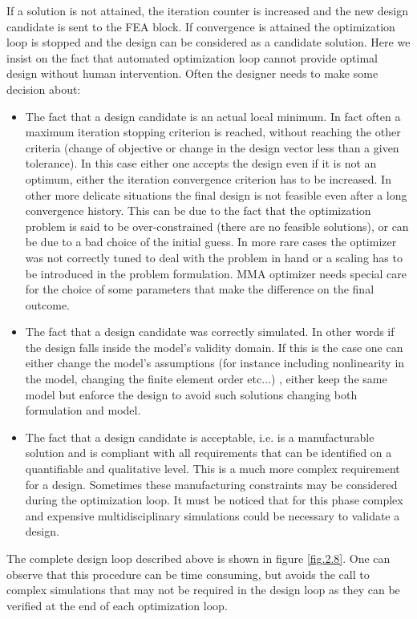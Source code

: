 If a solution is not attained, the iteration counter is increased and the new design candidate is sent to the FEA block.
If convergence is attained the optimization loop is stopped and the design can be considered as a candidate solution. Here we insist on the fact that automated optimization loop cannot provide optimal design without human intervention. 
Often the designer needs to make some decision about:
\begin{itemize}
\item The fact that a design candidate is an actual local minimum. In fact often a maximum iteration stopping criterion is reached, without reaching the other criteria (change of objective or change in the design vector less than a given tolerance). In this case either one accepts the design even if it is not an optimum, either the iteration convergence criterion has to be increased. In other more delicate situations the final design is not feasible even after a long convergence history. This can be due to the fact that the optimization problem is said to be over-constrained (there are no feasible solutions), or can be due to a bad choice of the initial guess. In more rare cases the optimizer was not correctly tuned to deal with the problem in hand or a scaling has to be introduced in the problem formulation. MMA optimizer needs special care for the choice of some parameters that make the difference on the final outcome.
\item The fact that a design candidate was correctly simulated. In other words if the design falls inside the model's validity domain. If this is the case one can either change the model's assumptions (for instance including nonlinearity in the model, changing the finite element order etc...) , either keep the same model but enforce the design to avoid such solutions changing both formulation and model. 
\item The fact that a design candidate is acceptable, i.e. is a manufacturable solution and is compliant with all requirements that can be identified on a quantifiable and qualitative level. This is a much more complex requirement for a design. Sometimes these manufacturing constraints may be considered during the optimization loop. It must be noticed that for this phase complex and expensive multidisciplinary simulations could be necessary to validate a design. 
\end{itemize}
The complete design loop described above is shown in figure \ref{fig.2.8}. One can observe that this procedure can be time consuming, but avoids the call to complex simulations that may not be required in the design loop as they  can be verified at the end of each optimization loop.
